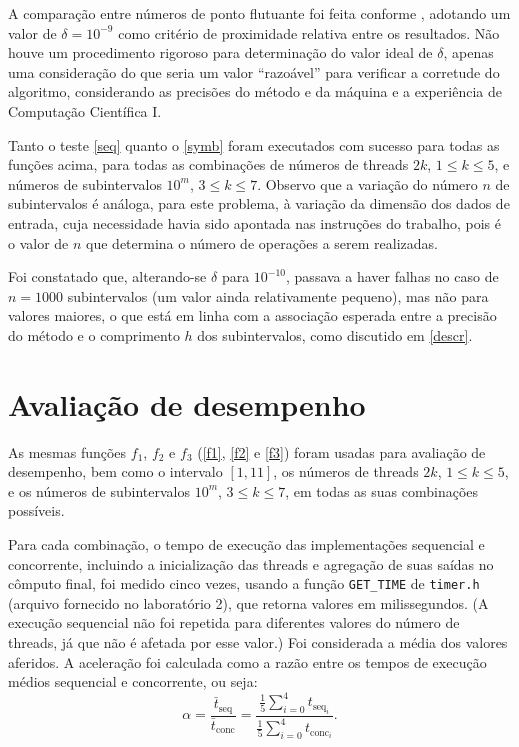 \documentclass{article}
\begin{document}
  A comparação entre números de ponto flutuante foi feita conforme \cite{float}, adotando um valor de $\delta = 10^{-9}$ como critério de proximidade relativa entre os resultados. Não houve um procedimento rigoroso para determinação do valor ideal de $\delta$, apenas uma consideração do que seria um valor ``razoável'' para verificar a corretude do algoritmo, considerando as precisões do método e da máquina e a experiência de Computação Científica I. 
  
  Tanto o teste \ref{seq} quanto o \ref{symb} foram executados com sucesso para todas as funções acima, para todas as combinações de números de threads $2k$, $1 \leq k \leq 5$, e números de subintervalos $10^m$, $3 \leq k \leq 7$. Observo que a variação do número $n$ de subintervalos é análoga, para este problema, à variação da dimensão dos dados de entrada, cuja necessidade havia sido apontada nas instruções do trabalho, pois é o valor de $n$ que determina o número de operações a serem realizadas.
  
  Foi constatado que, alterando-se $\delta$ para $10^{-10}$, passava a haver falhas no caso de $n = 1000$ subintervalos (um valor ainda relativamente pequeno), mas não para valores maiores, o que está em linha com a associação esperada entre a precisão do método e o comprimento $h$ dos subintervalos, como discutido em \ref{descr}.

  \section{Avaliação de desempenho} \label{perf}

  As mesmas funções $f_1$, $f_2$ e $f_3$ (\eqref{f1}, \eqref{f2} e \eqref{f3}) foram usadas para avaliação de desempenho, bem como o intervalo $[1, 11]$, os números de threads $2k$, $1 \leq k \leq 5$, e os números de subintervalos $10^m$, $3 \leq k \leq 7$, em todas as suas combinações possíveis.

  Para cada combinação, o tempo de execução das implementações sequencial e concorrente, incluindo a inicialização das threads e agregação de suas saídas no cômputo final, foi medido cinco vezes, usando a função \texttt{GET\_TIME} de \texttt{timer.h} (arquivo fornecido no laboratório 2), que retorna valores em milissegundos. (A execução sequencial não foi repetida para diferentes valores do número de threads, já que não é afetada por esse valor.) Foi considerada a média dos valores aferidos. A aceleração foi calculada como a razão entre os tempos de execução médios sequencial e concorrente, ou seja:
  $$ \alpha = \frac{\bar{t}_{\text{seq}}}{\bar{t}_{\text{conc}}} = \frac{\frac{1}{5} \sum_{i=0}^4 t_{\text{seq}_i}}{\frac{1}{5} \sum_{i=0}^4 t_{\text{conc}_i}}.$$
\end{document}
